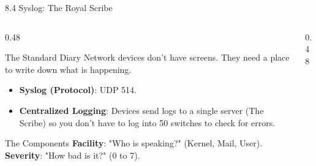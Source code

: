 \documentclass[aspectratio=169]{beamer}  %
\begin{document}
\begin{frame}{8.4 Syslog: The Royal Scribe}
    \begin{columns}[T]
        \begin{column}{0.48\textwidth}
            \begin{block}{The Standard Diary}
                \footnotesize
                Network devices don't have screens. They need a place to write down what is happening.
                \begin{itemize}
                    \item \textbf{Syslog (Protocol)}: UDP 514.
                    \item \textbf{Centralized Logging}: Devices send logs to a single server (The Scribe) so you don't have to log into 50 switches to check for errors.
                \end{itemize}
            \end{block}
            \begin{alertblock}{The Components}
                \footnotesize
                \textbf{Facility}: "Who is speaking?" (Kernel, Mail, User).\\
                \textbf{Severity}: "How bad is it?" (0 to 7).
            \end{alertblock}
        \end{column}
        \begin{column}{0.48\textwidth}
            \begin{center}
            \end{center}
        \end{column}
    \end{columns}
\end{frame}
\end{document}
